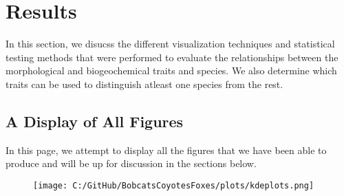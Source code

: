 \documentclass[a4paper]{article}
\begin{document}
\newpage

\section{Results}
In this section, we disucss the different visualization techniques and statistical testing methods that were performed to evaluate the relationships between
the morphological and biogeochemical traits and species. We also determine which traits can be used to distinguish atleast one species from the rest.

\subsection{A Display of All Figures}
In this page, we attempt to display all the figures that we have been able to produce and will be up for discussion in the sections below.

\begin{figure}[h]
    \centering
    \texttt{[image: C:/GitHub/BobcatsCoyotesFoxes/plots/kdeplots.png]}
\end{figure}
\end{document}
